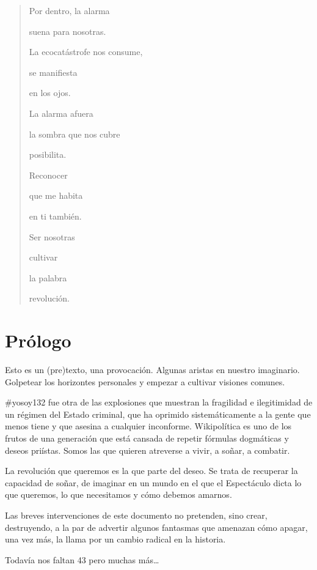 \begin{verse}
    Por dentro, la alarma
    
    suena para nosotras.
    
    La ecocatástrofe nos consume,
    
    se manifiesta
    
    en los ojos.
    
    La alarma afuera
    
    la sombra que nos cubre
    
    posibilita.
    
    Reconocer
    
    que me habita
    
    en ti también.
    
    Ser nosotras

        \hspace*{1cm}cultivar
        
        \hspace*{1cm}la palabra
        
        \hspace*{1cm}revolución.
        
\end{verse}


\hypertarget{prologue}{%
\section{Prólogo}\label{prologue}}

Esto es un (pre)texto, una provocación. Algunas aristas en nuestro
imaginario. Golpetear los horizontes personales y empezar a cultivar
visiones comunes.

\#yosoy132 fue otra de las explosiones que muestran la fragilidad e
ilegitimidad de un régimen del Estado criminal, que ha oprimido
sistemáticamente a la gente que menos tiene y que asesina a cualquier
inconforme. Wikipolítica es uno de los frutos de una generación que está
cansada de repetir fórmulas dogmáticas y deseos priístas. Somos las que
quieren atreverse a vivir, a soñar, a combatir.

La revolución que queremos es la que parte del deseo. Se trata de
recuperar la capacidad de soñar, de imaginar en un mundo en el que el
Espectáculo dicta lo que queremos, lo que necesitamos y cómo debemos
amarnos.

Las breves intervenciones de este documento no pretenden, sino crear,
destruyendo, a la par de advertir algunos fantasmas que amenazan cómo
apagar, una vez más, la llama por un cambio radical en la historia.

Todavía nos faltan 43 pero muchas más\ldots{}